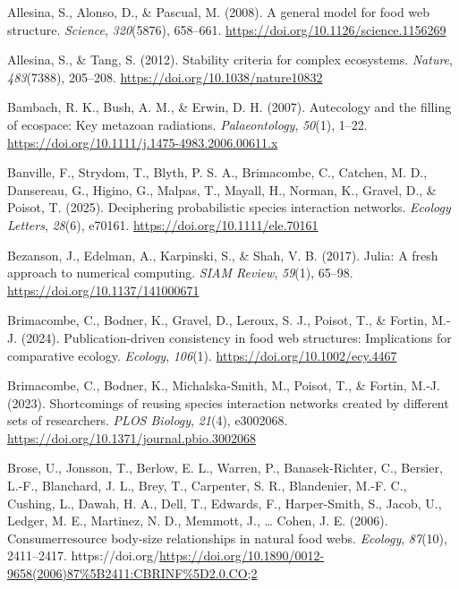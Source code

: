 \documentclass[
]{article}
\newlength{\cslhangindent}
\newenvironment{CSLReferences}[2] %
 {\begin{list}{}{%
  \setlength{\itemindent}{0pt}
  \setlength{\leftmargin}{0pt}
  \setlength{\parsep}{0pt}
  \ifodd #1
   \setlength{\leftmargin}{\cslhangindent}
   \setlength{\itemindent}{-1\cslhangindent}
  \fi
  \setlength{\itemsep}{#2\baselineskip}}}
 {\end{list}}
\begin{document}
\protect{}\label{refs}
\begin{CSLReferences}{1}{0}
Allesina, S., Alonso, D., \& Pascual, M. (2008). A general model for
food web structure. \emph{Science}, \emph{320}(5876), 658--661.
\url{https://doi.org/10.1126/science.1156269}

Allesina, S., \& Tang, S. (2012). Stability criteria for complex
ecosystems. \emph{Nature}, \emph{483}(7388), 205--208.
\url{https://doi.org/10.1038/nature10832}

Bambach, R. K., Bush, A. M., \& Erwin, D. H. (2007). Autecology and the
filling of ecospace: Key metazoan radiations. \emph{Palaeontology},
\emph{50}(1), 1--22.
\url{https://doi.org/10.1111/j.1475-4983.2006.00611.x}

Banville, F., Strydom, T., Blyth, P. S. A., Brimacombe, C., Catchen, M.
D., Dansereau, G., Higino, G., Malpas, T., Mayall, H., Norman, K.,
Gravel, D., \& Poisot, T. (2025). Deciphering probabilistic species
interaction networks. \emph{Ecology Letters}, \emph{28}(6), e70161.
\url{https://doi.org/10.1111/ele.70161}

Bezanson, J., Edelman, A., Karpinski, S., \& Shah, V. B. (2017). Julia:
A fresh approach to numerical computing. \emph{SIAM Review},
\emph{59}(1), 65--98. \url{https://doi.org/10.1137/141000671}

Brimacombe, C., Bodner, K., Gravel, D., Leroux, S. J., Poisot, T., \&
Fortin, M.-J. (2024). Publication{-}driven consistency in food web
structures: Implications for comparative ecology. \emph{Ecology},
\emph{106}(1). \url{https://doi.org/10.1002/ecy.4467}

Brimacombe, C., Bodner, K., Michalska-Smith, M., Poisot, T., \& Fortin,
M.-J. (2023). Shortcomings of reusing species interaction networks
created by different sets of researchers. \emph{PLOS Biology},
\emph{21}(4), e3002068.
\url{https://doi.org/10.1371/journal.pbio.3002068}

Brose, U., Jonsson, T., Berlow, E. L., Warren, P., Banasek-Richter, C.,
Bersier, L.-F., Blanchard, J. L., Brey, T., Carpenter, S. R.,
Blandenier, M.-F. C., Cushing, L., Dawah, H. A., Dell, T., Edwards, F.,
Harper-Smith, S., Jacob, U., Ledger, M. E., Martinez, N. D., Memmott,
J., \ldots{} Cohen, J. E. (2006). Consumer{\textendash}resource
body-size relationships in natural food webs. \emph{Ecology},
\emph{87}(10), 2411--2417.
https://doi.org/\url{https://doi.org/10.1890/0012-9658(2006)87\%5B2411:CBRINF\%5D2.0.CO;2}


\end{CSLReferences}
\end{document}
